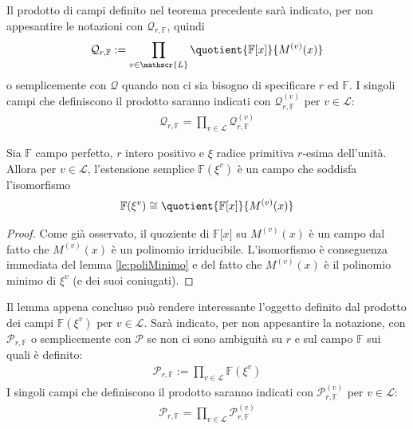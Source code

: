 Il prodotto di campi definito nel teorema precedente sarà indicato, per non appesantire le notazioni con $\mathcal{Q}_{r,\mathbb{F}}$, quindi
   \begin{align*}
      \mathcal{Q}_{r,\mathbb{F}}
      :=
      \prod_{v\in \mathscr{L}} \quotient{\mathbb{F} \lbrack x \rbrack  }{M^{(v)}(x)}
   \end{align*}
o semplicemente con $\mathcal{Q}$ quando non ci sia bisogno di specificare $r$ ed $\mathbb{F}$. I singoli campi che definiscono il prodotto saranno indicati con $\mathcal{Q}_{r,\mathbb{F}}^{(v)}$ per $v\in \mathscr{L}$:
   \begin{align*}
      \mathcal{Q}_{r,\mathbb{F}}
      =
      \prod_{v\in \mathscr{L}} \mathcal{Q}_{r,\mathbb{F}}^{(v)}
   \end{align*}
\begin{lemmax} \label{le:lemmaIsoMu}
   Sia $\mathbb{F}$ campo perfetto, $r$ intero positivo e $\xi$ radice primitiva $r$-esima dell'unità. Allora per $v \in \mathscr{L}$, l'estensione semplice $\mathbb{F}(\xi^{v})$ è un campo che soddisfa l'isomorfismo
      \begin{align*}
      \mathbb{F}(\xi^{v})
      \cong
      \quotient{\mathbb{F} \lbrack x \rbrack  }{M^{(v)}(x)}
   \end{align*}
\end{lemmax}
\begin{proof}
   Come già osservato, il quoziente di $\mathbb{F} \lbrack x \rbrack $ su $M^{(v)}(x)$ è un campo dal fatto che $M^{(v)}(x)$ è un polinomio irriducibile. L'isomorfismo è conseguenza immediata del lemma \ref{le:poliMinimo} e del fatto che $M^{(v)}(x)$ è il polinomio minimo di $\xi^{v}$ (e dei suoi coniugati).
\end{proof}
Il lemma appena concluso può rendere interessante l'oggetto definito dal prodotto dei campi $\mathbb{F}(\xi^{v})$ per $v \in \mathscr{L}$. Sarà indicato, per non appesantire la notazione, con $\mathcal{P}_{r,\mathbb{F}}$ o semplicemente con $\mathcal{P}$ se non ci sono ambiguità su $r$ e sul campo $\mathbb{F}$ sui quali è definito:
\begin{align*}
   \mathcal{P}_{r,\mathbb{F}} :=  \prod_{v\in \mathscr{L}} \mathbb{F}(\xi^{v})
\end{align*}
I singoli campi che definiscono il prodotto saranno indicati con $\mathcal{P}_{r,\mathbb{F}}^{(v)}$ per $v\in \mathscr{L}$:
   \begin{align*}
      \mathcal{P}_{r,\mathbb{F}}
      =
      \prod_{v\in \mathscr{L}} \mathcal{P}_{r,\mathbb{F}}^{(v)}
   \end{align*}

